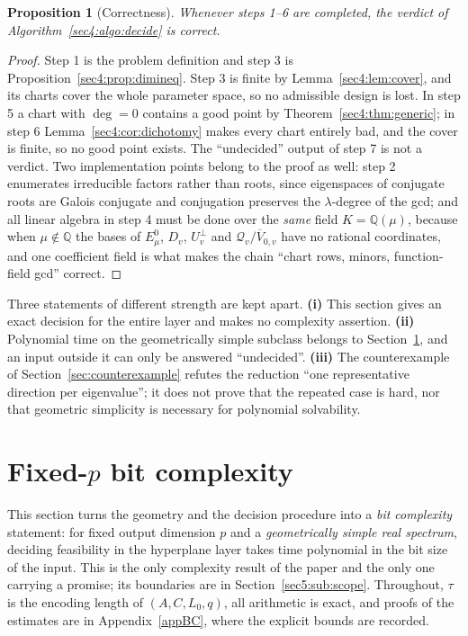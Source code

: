 \documentclass[journal]{IEEEtran}
\theoremstyle{plainn}
\newtheorem{prop}[thm]{Proposition}
\theoremstyle{remark}
\begin{document}
\begin{prop}[Correctness]
\label{sec4:prop:correct}
Whenever steps 1--6 are completed, the verdict of Algorithm~\ref{sec4:algo:decide} is correct.
\end{prop}

\begin{proof}
Step 1 is the problem definition and step 3 is Proposition~\ref{sec4:prop:dimineq}. Step 3 is finite by
Lemma~\ref{sec4:lem:cover}, and its charts cover the whole parameter space, so no admissible design is
lost. In step 5 a chart with $\deg=0$ contains a good point by Theorem~\ref{sec4:thm:generic}; in step 6
Lemma~\ref{sec4:cor:dichotomy} makes every chart entirely bad, and the cover is finite, so no good
point exists. The ``undecided'' output of step 7 is not a verdict. Two implementation points belong to
the proof as well: step 2 enumerates irreducible factors rather than roots, since eigenspaces of
conjugate roots are Galois conjugate and conjugation preserves the $\lambda$-degree of the gcd; and
all linear algebra in step 4 must be done over the \emph{same} field $K=\mathbb Q(\mu)$, because when
$\mu\notin\mathbb Q$ the bases of $E_\mu^0$, $D_v$, $U_v^\perp$ and
$\mathcal Q_v/\overline V_{0,v}$ have no rational coordinates, and one coefficient field is what makes
the chain ``chart rows, minors, function-field gcd'' correct.
\end{proof}

Three statements of different strength are kept apart. \textbf{(i)} This section gives an exact
decision for the entire layer and makes no complexity assertion. \textbf{(ii)} Polynomial time on the
geometrically simple subclass belongs to Section~\ref{sec5}, and an input outside it can only be
answered ``undecided''. \textbf{(iii)} The counterexample of Section~\ref{sec:counterexample} refutes
the reduction ``one representative direction per eigenvalue''; it does not prove that the repeated
case is hard, nor that geometric simplicity is necessary for polynomial solvability.

\section{Fixed-\texorpdfstring{$p$}{p} bit complexity}\label{sec5}\label{sec:complexity}

This section turns the geometry and the decision procedure into a \emph{bit complexity} statement: for
fixed output dimension $p$ and a \emph{geometrically simple real spectrum}, deciding feasibility in the
hyperplane layer takes time polynomial in the bit size of the input. This is the only complexity result
of the paper and the only one carrying a promise; its boundaries are in
Section~\ref{sec5:sub:scope}. Throughout, $\tau$ is the encoding length of $(A,C,L_0,q)$, all
arithmetic is exact, and proofs of the estimates are in Appendix~\ref{appBC}, where the explicit
bounds are recorded.
\end{document}
